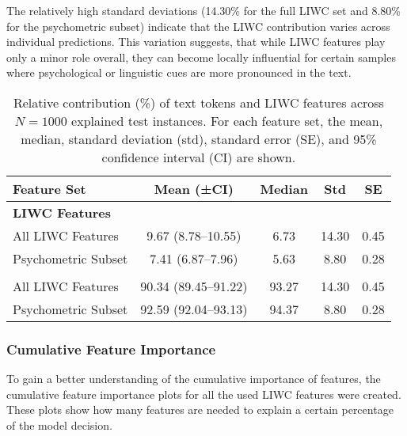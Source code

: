 The relatively high standard deviations (14.30\% for the full LIWC set and 8.80\% for the psychometric subset) indicate that the LIWC contribution varies across individual predictions. This variation suggests, that while LIWC features play only a minor role overall, they can become locally influential for certain samples where psychological or linguistic cues are more pronounced in the text.

\begin{table}[h!]
\centering
\caption[Relative contribution of text tokens and LIWC features.]{Relative contribution (\%) of text tokens and LIWC features across $N = 1000$ explained test instances. For each feature set, the mean, median, standard deviation (std), standard error (SE), and 95\% confidence interval (CI) are shown.}
\label{tab:liwc_vs_tokens}
\begin{tabular}{lcccc}
\toprule
\textbf{Feature Set} & \textbf{Mean (±CI)} & \textbf{Median} & \textbf{Std} & \textbf{SE} \\
\midrule
\multicolumn{5}{l}{\textbf{LIWC Features}} \\
All LIWC Features     & 9.67 (8.78–10.55) & 6.73 & 14.30 & 0.45 \\
Psychometric Subset   & 7.41 (6.87–7.96)  & 5.63 &  8.80 & 0.28 \\
\addlinespace[0.3em]
\midrule
\multicolumn{5}{l}{\textbf{Text Tokens}} \\
All LIWC Features     & 90.34 (89.45–91.22) & 93.27 & 14.30 & 0.45 \\
Psychometric Subset   & 92.59 (92.04–93.13) & 94.37 &  8.80 & 0.28 \\
\bottomrule
\end{tabular}
\end{table}


\subsubsection{Cumulative Feature Importance}

To gain a better understanding of the cumulative importance of features, the cumulative feature importance plots for all the used LIWC features were created. These plots show how many features are needed to explain a certain percentage of the model decision.

